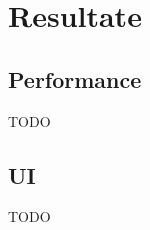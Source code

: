 
\chapter{Resultate}
\section{Performance}
\begin{flushleft}
TODO
\end{flushleft}
\section{UI}
\begin{flushleft}
TODO
\end{flushleft}